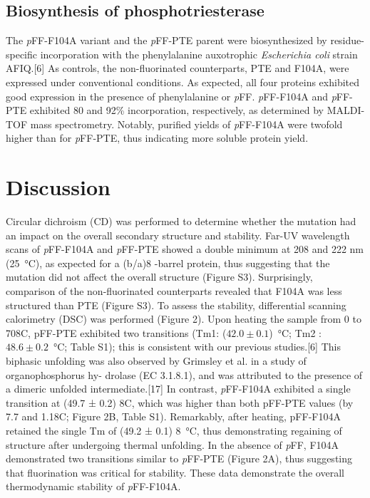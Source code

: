 \begin{refsection}
\subsection{Biosynthesis of phosphotriesterase}

The \emph{p}FF-F104A variant and the \emph{p}FF-PTE parent were biosynthesized
by residue-specific incorporation with the phenylalanine auxotrophic
\emph{Escherichia coli} strain AFIQ.[6] As controls, the non-fluorinated
counterparts, PTE and F104A, were expressed under conventional conditions. As
expected, all four proteins exhibited good expression in the presence of
phenylalanine or \emph{p}FF. \emph{p}FF-F104A and \emph{p}FF-PTE exhibited 80
and 92\% incorporation, respectively, as determined by MALDI-TOF mass
spectrometry. Notably, purified yields of \emph{p}FF-F104A were twofold higher
than for \emph{p}FF-PTE, thus indicating more soluble protein yield.

\section{Discussion}

Circular dichroism (CD) was performed to determine whether the mutation had an
impact on the overall secondary structure and stability. Far-UV wavelength
scans of \emph{p}FF-F104A and \emph{p}FF-PTE showed a double minimum at 208 and
222 nm (\SI{25}{\celsius}), as expected for a (b/a)8 -barrel protein, thus
suggesting that the mutation did not affect the overall structure (Figure S3).
Surprisingly, comparison of the non-fluorinated counterparts revealed that
F104A was less structured than PTE (Figure S3). To assess the stability,
differential scanning calorimetry (DSC) was performed (Figure 2). Upon heating
the sample from 0 to 708C, pFF-PTE exhibited two transitions (Tm1:
($42.0\pm0.1$)\SI{}{\celsius}; Tm2 : $48.6 \pm 0.2$\SI{}{\celsius}; Table
S1); this is consistent with our previous studies.[6] This biphasic unfolding
was also observed by Grimsley et al. in a study of organophosphorus hy- drolase
(EC 3.1.8.1), and was attributed to the presence of a dimeric unfolded
intermediate.[17] In contrast, \emph{p}FF-F104A exhibited a single transition
at (49.7 ± 0.2) 8C, which was higher than both pFF-PTE values (by 7.7 and
1.18C; Figure 2B, Table S1).  Remarkably, after heating, pFF-F104A retained the
single Tm of (49.2 ± 0.1) \SI{8}{\celsius}, thus demonstrating regaining of
structure after undergoing thermal unfolding.  In the absence of \emph{p}FF,
F104A demonstrated two transitions similar to \emph{p}FF-PTE (Figure 2A), thus
suggesting that fluorination was critical for stability. These data demonstrate
the overall thermodynamic stability of \emph{p}FF-F104A.


\end{refsection}
